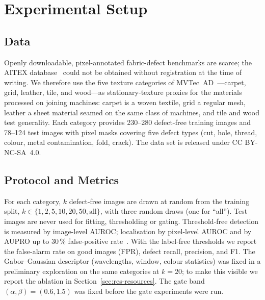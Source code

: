 \section{Experimental Setup}\label{sec:setup}

\subsection{Data}
Openly downloadable, pixel-annotated fabric-defect benchmarks are scarce; the AITEX database~\cite{silvestre2019aitex} could not be obtained without registration at the time of writing. We therefore use the five texture categories of MVTec~AD~\cite{bergmann2019mvtec,bergmann2021mvtec}---carpet, grid, leather, tile, and wood---as stationary-texture proxies for the materials processed on joining machines: carpet is a woven textile, grid a regular mesh, leather a sheet material seamed on the same class of machines, and tile and wood test generality. Each category provides 230--280 defect-free training images and 78--124 test images with pixel masks covering five defect types (\eg cut, hole, thread, colour, metal contamination, fold, crack). The data set is released under CC BY-NC-SA~4.0.

\subsection{Protocol and Metrics}
For each category, $k$ defect-free images are drawn at random from the training split, $k\in\{1,2,5,10,20,50,\text{all}\}$, with three random draws (one for ``all''). Test images are never used for fitting, thresholding or gating. Threshold-free detection is measured by image-level AUROC; localisation by pixel-level AUROC and by AUPRO up to 30\,\% false-positive rate~\cite{bergmann2021mvtec}. With the label-free thresholds we report the false-alarm rate on good images (FPR), defect recall, precision, and F1. The Gabor--Gaussian descriptor (wavelengths, window, colour statistics) was fixed in a preliminary exploration on the same categories at $k=20$; to make this visible we report the ablation in Section~\ref{sec:res-resources}. The gate band $(\alpha,\beta)=(0.6,1.5)$ was fixed before the gate experiments were run.

